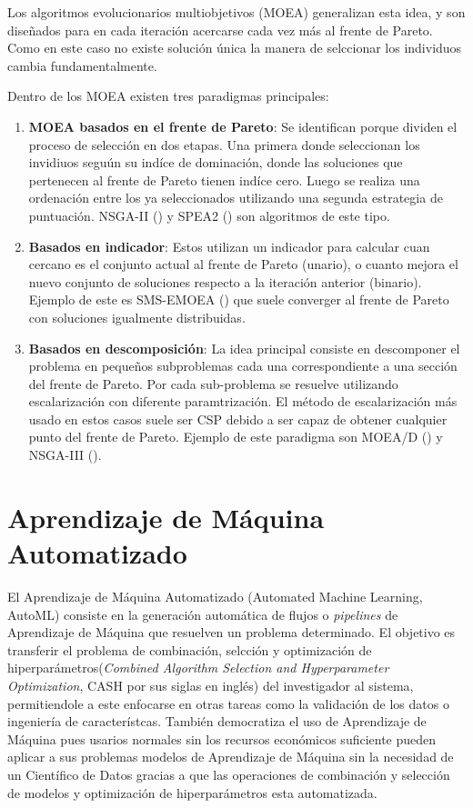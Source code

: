 Los algoritmos evolucionarios multiobjetivos (MOEA) generalizan esta idea, y son diseñados para en cada iteraci\'on acercarse cada vez m\'as al frente de Pareto. Como en este caso no existe soluci\'on \'unica la manera de selccionar los individuos cambia fundamentalmente.

Dentro de los MOEA existen tres paradigmas principales:
\begin{enumerate}
    \item \textbf{MOEA basados en el frente de Pareto}: Se identifican porque dividen el proceso de selecci\'on en dos etapas. Una primera donde seleccionan los invidiuos segu\'un su ind\'ice de dominaci\'on, donde las soluciones que pertenecen al frente de Pareto tienen ind\'ice cero. Luego se realiza una ordenaci\'on entre los ya seleccionados utilizando una segunda estrategia de puntuaci\'on. NSGA-II (\cite{deb2002fast}) y SPEA2 (\cite{zitzler1999multiobjective}) son algoritmos de este tipo.

    \item \textbf{Basados en indicador}: Estos utilizan un indicador para calcular cuan cercano es el conjunto actual al frente de Pareto (unario), o cuanto mejora el nuevo conjunto de soluciones respecto a la iteraci\'on anterior (binario). Ejemplo de este es SMS-EMOEA (\cite{emmerich2005emo}) que suele converger al frente de Pareto con soluciones igualmente distribuidas.

    \item \textbf{Basados en descomposici\'on}: La idea principal consiste en descomponer el problema en pequeños subproblemas cada una correspondiente a una secci\'on del frente de Pareto. Por cada sub-problema se resuelve utilizando escalarizaci\'on con diferente paramtrizaci\'on. El m\'etodo de escalarizaci\'on m\'as usado en estos casos suele ser CSP debido a ser capaz de obtener cualquier punto del frente de Pareto. Ejemplo de este paradigma son MOEA/D (\cite{zhang2007moea}) y NSGA-III (\cite{deb2013evolutionary}).

\end{enumerate}


\section{Aprendizaje de M\'aquina Automatizado}
El Aprendizaje de M\'aquina Automatizado (Automated Machine Learning, AutoML) consiste en la generaci\'on autom\'atica de flujos o \textit{pipelines} de Aprendizaje de M\'aquina que resuelven un problema determinado. El objetivo es transferir el problema de combinaci\'on, selcci\'on y optimizaci\'on de hiperpar\'ametros(\textit{Combined Algorithm Selection and Hyperparameter Optimization}, CASH por sus siglas en ingl\'es) del investigador al sistema, permitiendole a este enfocarse en otras tareas como la validaci\'on de los datos o ingenier\'ia de caracter\'istcas. Tambi\'en democratiza el uso de Aprendizaje de M\'aquina pues usarios normales sin los recursos econ\'omicos suficiente pueden aplicar a sus problemas modelos de Aprendizaje de M\'aquina sin la necesidad de un Cient\'ifico de Datos gracias a que las operaciones de combinaci\'on y selecci\'on de modelos y optimizaci\'on de hiperpar\'ametros esta automatizada.

